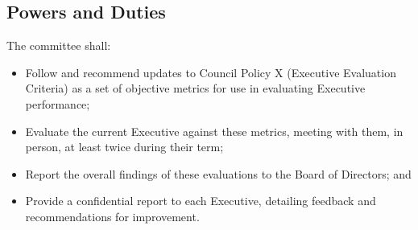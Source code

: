\subsection{Powers and Duties}

The committee shall:
\begin{itemize}
    \item Follow and recommend updates to Council Policy X (Executive
        Evaluation Criteria) as a set of objective metrics for use in
        evaluating Executive performance;
    \item Evaluate the current Executive against these metrics, meeting with
        them, in person, at least twice during their term;
    \item Report the overall findings of these evaluations to the Board of
        Directors; and
    \item Provide a confidential report to each Executive, detailing feedback
        and recommendations for improvement.
\end{itemize}
